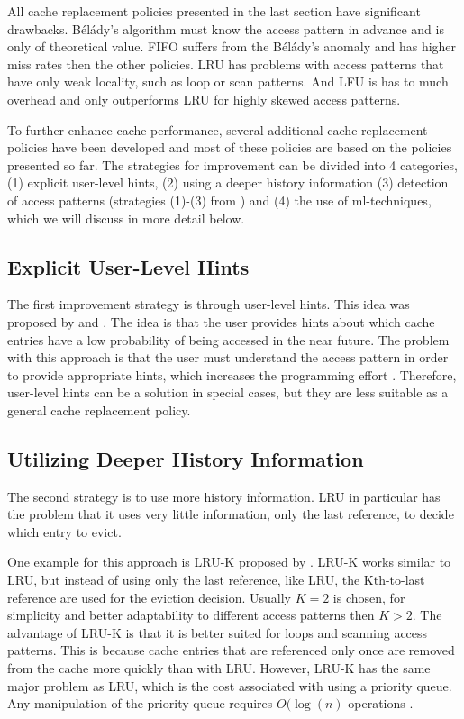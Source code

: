 \documentclass[
	12pt,
	a4paper,
	abstract,
	bibliography=totoc,
	chapterprefix,
	headings=openright,
	numbers=endperiod,
	parskip=half,
	twoside,
]{scrreprt}
\begin{document}
All cache replacement policies presented in the last section have significant drawbacks.
Bélády's algorithm must know the access pattern in advance and is only of theoretical value.
FIFO suffers from the Bélády's anomaly and has higher miss rates then the other policies.
LRU has problems with access patterns that have only weak locality, such as loop or scan patterns.
And LFU is has to much overhead and only outperforms LRU for highly skewed access patterns. 

To further enhance cache performance, several additional cache replacement policies have been developed and
most of these policies are based on the policies presented so far.
The strategies for improvement can be divided into 4 categories,
(1) explicit user-level hints, (2) using a deeper history information
(3) detection of access patterns (strategies (1)-(3) from \cite{10.1145/511399.511340})
and (4) the use of ml-techniques, which we will discuss in more detail below.

\subsection{Explicit User-Level Hints}

The first improvement strategy is through user-level hints.
This idea was proposed by \cite{cao1994application} and \cite{patterson1995informed}.
The idea is that the user provides hints about which cache entries have a low probability of being accessed in the near future.
The problem with this approach is that the user must understand the access pattern in order to provide appropriate hints, which increases the programming effort \cite{10.1145/511399.511340}.
Therefore, user-level hints can be a solution in special cases,
but they are less suitable as a general cache replacement policy.

\subsection{Utilizing Deeper History Information}

The second strategy is to use more history information.
LRU in particular has the problem that it uses very little information, only the last reference, to decide which entry to evict.

One example for this approach is LRU-K proposed by \cite{o1993lru}.
LRU-K works similar to LRU, but instead of using only the last reference, like LRU,
the Kth-to-last reference are used for the eviction decision. 
Usually $K = 2$ is chosen, for simplicity and better adaptability to different access patterns then $K > 2$.
The advantage of LRU-K is that it is better suited for loops and scanning access patterns.
This is because cache entries that are referenced only once are removed from the cache more quickly than with LRU.
However, LRU-K has the same major problem as LRU, which is the cost associated with using a priority queue.
Any manipulation of the priority queue requires $O(\log(n)$ operations \cite{10.1145/511399.511340}.
\end{document}
